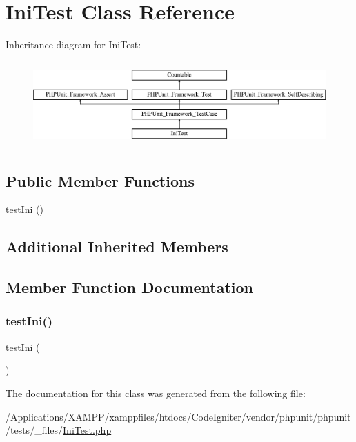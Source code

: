 \hypertarget{class_ini_test}{}\section{Ini\+Test Class Reference}
\label{class_ini_test}
Inheritance diagram for Ini\+Test\+:\begin{figure}[H]
\begin{center}
\leavevmode
\includegraphics[height=3.303835cm]{class_ini_test}
\end{center}
\end{figure}
\subsection*{Public Member Functions}
\begin{DoxyCompactItemize}
\item 
\mbox{\hyperlink{class_ini_test_a2103a4a945d3f7f7fdfe870021122d33}{test\+Ini}} ()
\end{DoxyCompactItemize}
\subsection*{Additional Inherited Members}


\subsection{Member Function Documentation}
\mbox{\label{class_ini_test_a2103a4a945d3f7f7fdfe870021122d33}} 
\subsubsection{\texorpdfstring{test\+Ini()}{testIni()}}
{\footnotesize\ttfamily test\+Ini (\begin{DoxyParamCaption}{ }\end{DoxyParamCaption})}



The documentation for this class was generated from the following file\+:\begin{DoxyCompactItemize}
\item 
/\+Applications/\+X\+A\+M\+P\+P/xamppfiles/htdocs/\+Code\+Igniter/vendor/phpunit/phpunit/tests/\+\_\+files/\mbox{\hyperlink{_ini_test_8php}{Ini\+Test.\+php}}\end{DoxyCompactItemize}

